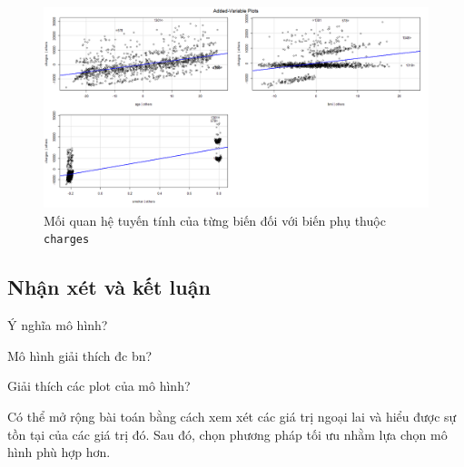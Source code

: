 \begin{figure}[H]
	\centering
	\includegraphics[width=0.8\linewidth]{images/A1/model-bic-vars}
	\caption{Mối quan hệ tuyến tính của từng biến đối với biến phụ thuộc \texttt{charges}}
	\label{fig-a1:model-bic-vars}
\end{figure}


\subsection*{Nhận xét và kết luận}

Ý nghĩa mô hình?

Mô hình giải thích đc bn?

Giải thích các plot của mô hình?

Có thể mở rộng bài toán bằng cách xem xét các giá trị ngoại lai và hiểu được sự tồn tại của các giá trị đó. Sau đó, chọn phương pháp tối ưu nhằm lựa chọn mô hình phù hợp hơn.
